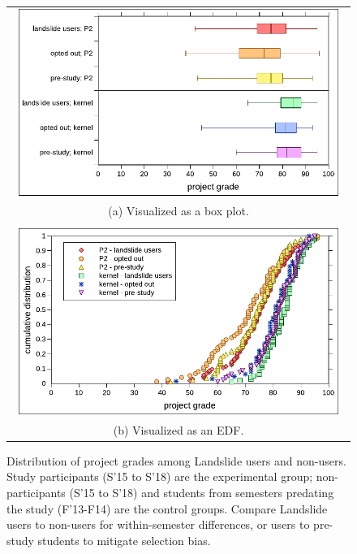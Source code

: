 \begin{figure}[p]
	\begin{center}
	\begin{tabular}{c}
		\includegraphics[width=0.96\textwidth]{photo-of-ze-studence.pdf}
		\\
		(a) Visualized as a box plot.
		\\
		\\
		\includegraphics[width=0.96\textwidth]{photo-of-ze-studence-cdf.pdf}
		\\
		(b) Visualized as an EDF.
	\end{tabular}
	\end{center}
	\caption[Distribution of project grades among Landslide users and non-users.]
		{Distribution of project grades among Landslide users and non-users.
	Study participants (S'15 to S'18) are the experimental group;
	non-participants (S'15 to S'18)
	and students from semesters predating the study (F'13-F14) are the control groups.
	Compare Landslide users to non-users for within-semester differences,
	or users to pre-study students to mitigate selection bias.}
	\label{fig:photo-of-ze-studence}
\end{figure}

